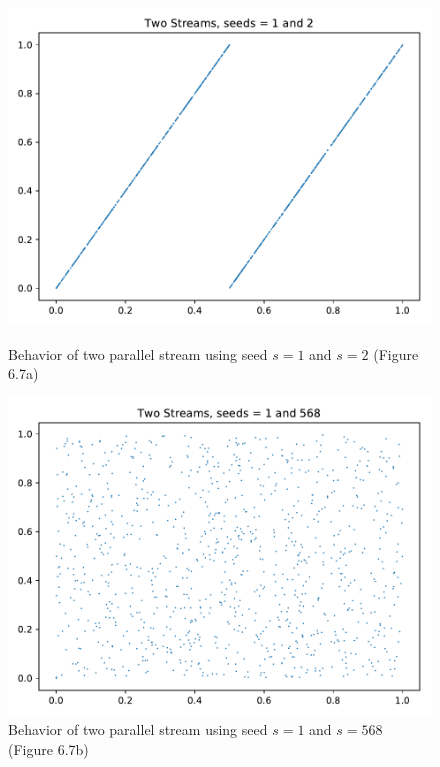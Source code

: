 \documentclass[11pt,a4paper]{article}
\begin{document}
\begin{figure}[ht]
	\centering
	\begin{minipage}{0.45\textwidth}
		\centering
		\includegraphics[width=\textwidth]{fig-6_7a}
		\caption{Behavior of two parallel stream using seed $s=1$ and $s=2$ (Figure 6.7a) }
		\label{fig:6_7a}
	\end{minipage}
	\begin{minipage}{0.45\textwidth}
		\centering
		\includegraphics[width=\textwidth]{fig-6_7b}
		\caption{Behavior of two parallel stream using seed $s=1$ and $s=568$ (Figure 6.7b)}
		\label{fig:6_7b}
	\end{minipage}
\end{figure}
\end{document}
